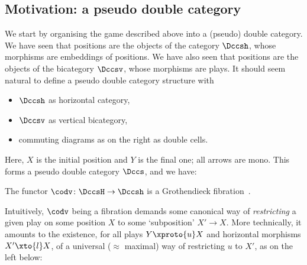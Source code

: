 \documentclass{LMCS}
\theoremstyle{plain}\newtheorem{satz}[thm]{Satz}
\begin{document}
\subsection{Motivation: a pseudo double category}\label{subsec:pseudodouble}
\begin{wrapfigure}[6]{r}{0pt}
  \begin{minipage}[c]{0.25\linewidth}
    \vspace*{-1.5em}
  \end{minipage}
\end{wrapfigure}
We start by organising the game described above into a (pseudo) double
category.  We have seen that positions are the objects of the category
$\Dccsh$, whose morphisms are embeddings of positions.  We have also
seen that positions are the objects of the bicategory $\Dccsv$, whose
morphisms are plays.  It should seem natural to define a pseudo double
category structure with
\begin{itemize}
\item $\Dccsh$ as horizontal category,
\item $\Dccsv$ as vertical bicategory,
\item commuting diagrams as on the right as double cells.
\end{itemize}
Here, $X$ is the initial position and $Y$ is the final one;
all arrows are mono.
  This forms a pseudo double category $\Dccs$, and we have:
\begin{prop}\label{prop:pseudodouble}
  The functor $\codv \colon \DccsH \to \Dccsh$ is a Grothendieck
  fibration~\citep{Jacobs}.
\end{prop}
Intuitively, $\codv$ being a fibration demands some canonical way of
\emph{restricting} a given play on some position $X$ to some
`subposition' $X' \to X$.  More technically, it amounts to the
existence, for all plays $Y \xproto{u} X$ and horizontal morphisms $X'
\xto{l} X$, of a universal ($\approx$ maximal) way of restricting $u$
to $X'$, as on the left below:
\end{document}
